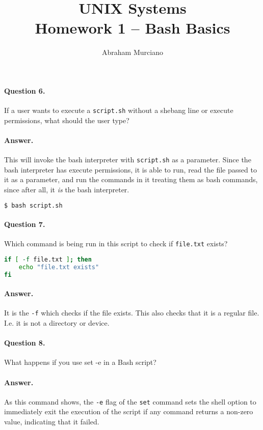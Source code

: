 \documentclass{article}
\title{UNIX Systems \\
\medskip
\large Homework 1 -- Bash Basics}
\author{Abraham Murciano}
\begin{document}
\maketitle

\paragraph{Question 6.} If a user wants to execute a \verb`script.sh` without a shebang line or execute permissions, what should the user type?

\paragraph{Answer.} This will invoke the bash interpreter with \verb`script.sh` as a parameter. Since the bash interpreter has execute permissions, it is able to run, read the file passed to it as a parameter, and run the commands in it treating them as bash commands, since after all, it \emph{is} the bash interpreter.

\begin{lstlisting}[language=bash]
$ bash script.sh
\end{lstlisting}

\paragraph{Question 7.} Which command is being run in this script to check if \verb`file.txt` exists?

\begin{lstlisting}[language=bash]
if [ -f file.txt ]; then
	echo "file.txt exists"
fi
\end{lstlisting}

\paragraph{Answer.} It is the \verb`-f` which checks if the file exists. This also checks that it is a regular file. I.e. it is not a directory or device.

\paragraph{Question 8.} What happens if you use set -e in a Bash script?

\paragraph{Answer.} As this command shows, the \verb`-e` flag of the \verb`set` command sets the shell option to immediately exit the execution of the script if any command returns a non-zero value, indicating that it failed.
\end{document}
